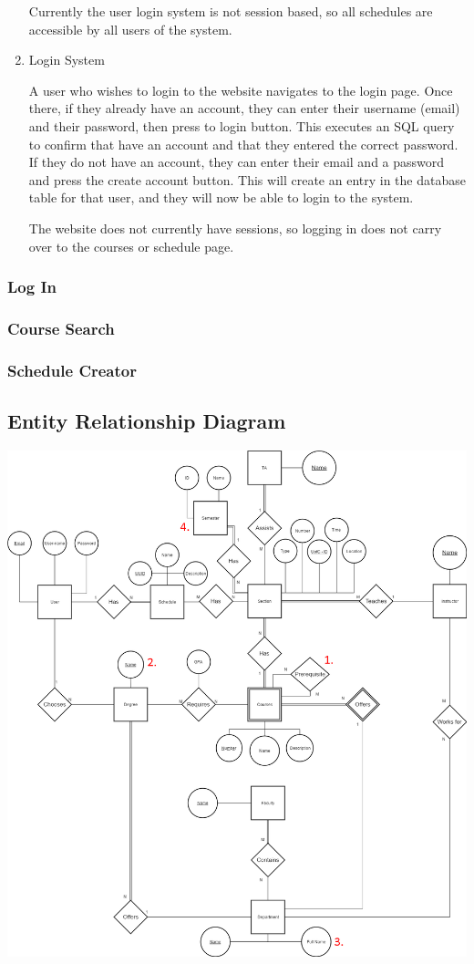 \documentclass[twoside=false,a4paper,11pt]{article}
\theoremstyle{mytheor}
\begin{document}
\begin{enumerate}
	Currently the user login system is not session based, so all schedules are accessible by all users of the system.

	\item Login System

	A user who wishes to login to the website navigates to the login page. Once there, if they already have an account, they can enter their username (email) and their password, then press to login button. This executes an SQL query to confirm that have an account and that they entered the correct password. If they do not have an account, they can enter their email and a password and press the create account button. This will create an entry in the database table for that user, and they will now be able to login to the system.

	The website does not currently have sessions, so logging in does not carry over to the courses or schedule page. 

\end{enumerate}

\subsubsection*{Log In}
\subsubsection*{Course Search}
\subsubsection*{Schedule Creator}

\subsection*{Entity Relationship Diagram}

\includegraphics[width=\textwidth]{ERDiagram.png}
\end{document}
